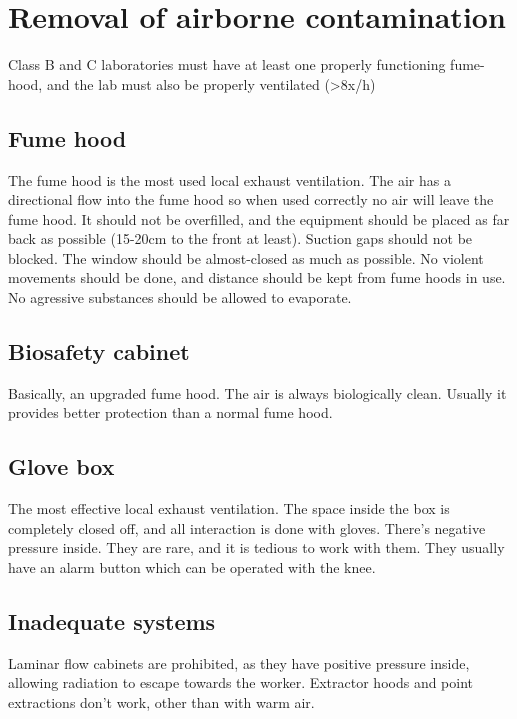 \section{Removal of airborne contamination}
Class B and C laboratories must have at least one properly functioning fume-hood, and the lab must also be properly ventilated (>8x/h)
\subsection{Fume hood}
The fume hood is the most used local exhaust ventilation. The air has a directional flow into the fume hood so when used correctly no air will leave the fume hood. It should not be overfilled, and the equipment should be placed as far back as possible (15-20cm to the front at least). Suction gaps should not be blocked. The window should be almost-closed as much as possible. No violent movements should be done, and distance should be kept from fume hoods in use. No agressive substances should be allowed to evaporate.
\subsection{Biosafety cabinet}
Basically, an upgraded fume hood. The air is always biologically clean. Usually it provides better protection than a normal fume hood.
\subsection{Glove box}
The most effective local exhaust ventilation. The space inside the box is completely closed off, and all interaction is done with gloves. There's negative pressure inside. They are rare, and it is tedious to work with them. They usually have an alarm button which can be operated with the knee.
\subsection{Inadequate systems}
Laminar flow cabinets are prohibited, as they have positive pressure inside, allowing radiation to escape towards the worker. Extractor hoods and point extractions don't work, other than with warm air.

